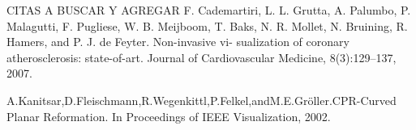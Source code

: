 


CITAS A BUSCAR Y AGREGAR
F. Cademartiri, L. L. Grutta, A. Palumbo, P. Malagutti, F. Pugliese, W. B. Meijboom, T. Baks, N. R. Mollet, N. Bruining, R. Hamers, and P. J. de Feyter. Non-invasive vi- sualization of coronary atherosclerosis: state-of-art. Journal of Cardiovascular Medicine, 8(3):129–137, 2007.

A.Kanitsar,D.Fleischmann,R.Wegenkittl,P.Felkel,andM.E.Gröller.CPR-Curved Planar Reformation. In Proceedings of IEEE Visualization, 2002.
